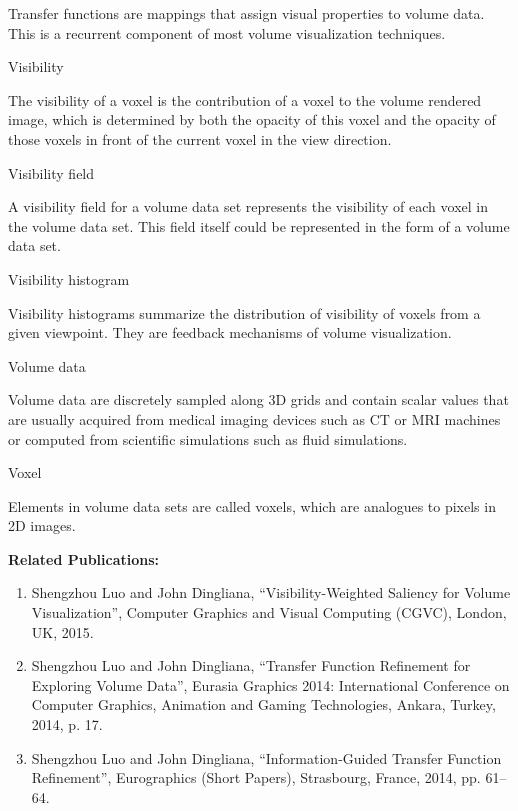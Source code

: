 \documentclass[a4paper, 12pt, twoside, openright]{report}         %
\begin{document}
\begin{description}
Transfer functions are mappings that assign visual properties to volume data. This is a recurrent component of most volume visualization techniques.

\item Visibility

The visibility of a voxel is the contribution of a voxel to the volume rendered image, which is determined by both the opacity of this voxel and the opacity of those voxels in front of the current voxel in the view direction.

\item Visibility field

A visibility field for a volume data set represents the visibility of each voxel in the volume data set. This field itself could be represented in the form of a volume data set.

\item Visibility histogram

Visibility histograms summarize the distribution of visibility of voxels from a given viewpoint. They are feedback mechanisms of volume visualization.

\item Volume data

Volume data are discretely sampled along 3D grids and contain scalar values that are usually acquired from medical imaging devices such as CT or MRI machines or computed from scientific simulations such as fluid simulations.

\item Voxel

Elements in volume data sets are called voxels, which are analogues to pixels in 2D images.

\end{description}

\cleardoublepage



\newpage

\textbf{Related Publications:}\label{publication_list}
\begin{enumerate}
	\item Shengzhou Luo and John Dingliana, ``Visibility-Weighted Saliency for Volume Visualization'', Computer Graphics and Visual Computing (CGVC), London, UK, 2015.
	\item Shengzhou Luo and John Dingliana, ``Transfer Function Refinement for Exploring Volume Data'', Eurasia Graphics 2014: International Conference on Computer Graphics, Animation and Gaming Technologies, Ankara, Turkey, 2014, p. 17.
	\item Shengzhou Luo and John Dingliana, ``Information-Guided Transfer Function Refinement'', Eurographics (Short Papers), Strasbourg, France, 2014, pp. 61--64.
\end{enumerate}
\end{document}
